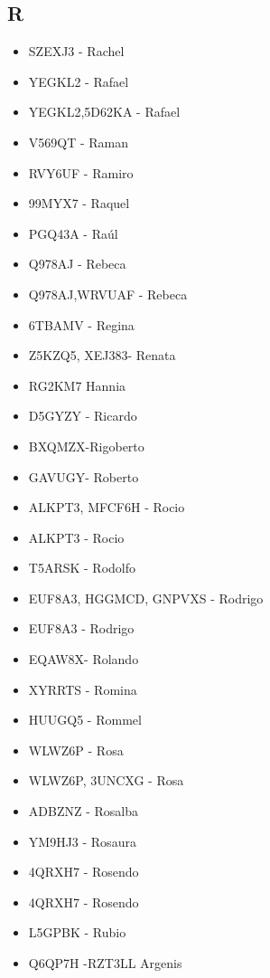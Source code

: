 \subsection*{R}
\begin{itemize}[leftmargin=*,nosep]
\item SZEXJ3 - Rachel
\item YEGKL2 - Rafael
\item YEGKL2,5D62KA - Rafael
\item V569QT - Raman
\item RVY6UF - Ramiro
\item 99MYX7 - Raquel
\item PGQ43A - Raúl
\item Q978AJ - Rebeca
\item Q978AJ,WRVUAF - Rebeca
\item 6TBAMV - Regina
\item Z5KZQ5, XEJ383- Renata
\item RG2KM7 Hannia
\item D5GYZY - Ricardo
\item BXQMZX-Rigoberto
\item GAVUGY- Roberto
\item ALKPT3, MFCF6H - Rocio
\item ALKPT3 - Rocio
\item T5ARSK - Rodolfo
\item EUF8A3, HGGMCD, GNPVXS - Rodrigo
\item EUF8A3 - Rodrigo
\item EQAW8X- Rolando
\item XYRRTS - Romina
\item HUUGQ5 - Rommel
\item WLWZ6P - Rosa
\item WLWZ6P, 3UNCXG - Rosa
\item ADBZNZ - Rosalba
\item YM9HJ3 - Rosaura
\item 4QRXH7 - Rosendo
\item 4QRXH7 - Rosendo
\item L5GPBK - Rubio
\item Q6QP7H -RZT3LL Argenis
\end{itemize}

